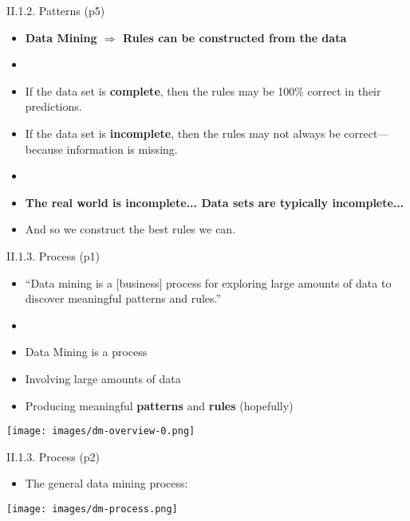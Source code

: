 \documentclass[handout]{beamer}
\newcommand{\strong}[1]{\textbf{\color{teal} #1}}
\newcommand{\stronger}[1]{\textbf{\color{purple} #1}}
\begin{document}
\begin{frame}{II.1.2. Patterns (p5)}
\begin{itemize}
\item[] \strong{Data Mining $\Rightarrow$ Rules can be constructed from the data}
\item[]
\item If the data set is \textbf{complete}, then the rules may be 100\% correct in their predictions.
\item If the data set is \textbf{incomplete}, then the rules may not always be correct---because information is missing.
\item[]
\item \stronger{The real world is incomplete... Data sets are typically incomplete...}
\item And so we construct the best rules we can.
\end{itemize}
\end{frame}
\begin{frame}{II.1.3. Process (p1)}
\begin{itemize}
\item[] ``Data mining is a [business] process for exploring large amounts of data to discover meaningful patterns and rules.''~\cite{LB3:2011}
\item[]
\item Data Mining is a process
\item Involving large amounts of data
\item Producing meaningful \strong{patterns} and \strong{rules} (hopefully) 
\end{itemize}
\begin{center}
\texttt{[image: images/dm-overview-0.png]}
\end{center}
\end{frame}
\begin{frame}{II.1.3. Process (p2)}
\begin{itemize}
\item[] The general data mining process:
\end{itemize}
\begin{center}
\texttt{[image: images/dm-process.png]}
\end{center}
\end{frame}
\end{document}
